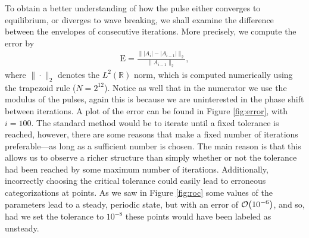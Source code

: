 \documentclass[10pt,twocolumn,a4paper]{article}
\let\originalleft\left
\let\originalright\right
\renewcommand{\left}{\mathopen{}\mathclose\bgroup\originalleft}
\renewcommand{\right}{\aftergroup\egroup\originalright}
\providecommand{\bigO}[1]{\ensuremath{\mathop{}\mathopen{}\mathcal{O}\mathopen{}\left(#1\right)}}
\begin{document}
To obtain a better understanding of how the pulse either converges to equilibrium, or diverges to wave breaking, we shall examine the difference between the envelopes of consecutive iterations. More precisely, we compute the error by
\begin{align}
\textrm{E} = \frac{\| |A_i| - |A_{i-1}| \|_2}{\| A_{i-1} \|_2},
\label{eq:error}
\end{align}
where $\| \cdot \|_2$ denotes the $L^2(\mathbb{R})$ norm, which is computed numerically using the trapezoid rule ($N = 2^{12}$). Notice as well that in the numerator we use the modulus of the pulses, again this is because we are uninterested in the phase shift between iterations. A plot of the error can be found in Figure \ref{fig:error}, with $i = 100$. The standard method would be to iterate until a fixed tolerance is reached, however, there are some reasons that make a fixed number of iterations preferable---as long as a sufficient number is chosen. The main reason is that this allows us to observe a richer structure than simply whether or not the tolerance had been reached by some maximum number of iterations. Additionally, incorrectly choosing the critical tolerance could easily lead to erroneous categorizations at points. As we saw in Figure \ref{fig:roc} some values of the parameters lead to a steady, periodic state, but with an error of $\bigO{10^{-6}}$, and so, had we set the tolerance to $10^{-8}$ these points would have been labeled as unsteady. \\
\end{document}
